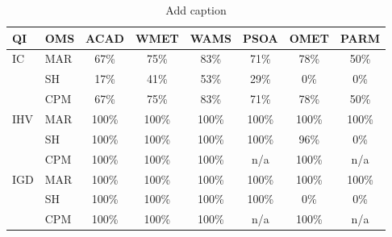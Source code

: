 \begin{table}[htbp]
  \centering
  \caption{Add caption}
    \begin{tabular}{llcccccc}
    \toprule
    \textbf{QI} & \textbf{OMS} & \textbf{ACAD} & \textbf{WMET} & \textbf{WAMS} & \textbf{PSOA} & \textbf{OMET} & \textbf{PARM} \\
    \midrule
    \multirow{3}[1]{*}{IC} & MAR   & 67\%  & 75\%  & 83\%  & 71\%  & 78\%  & 50\% \\
          & SH    & 17\%  & 41\%  & 53\%  & 29\%  & 0\%   & 0\% \\
          & CPM   & 67\%  & 75\%  & 83\%  & 71\%  & 78\%  & 50\% \\
    \multirow{3}[2]{*}{IHV} & MAR   & 100\% & 100\% & 100\% & 100\% & 100\% & 100\% \\
          & SH    & 100\% & 100\% & 100\% & 100\% & 96\%  & 0\% \\
          & CPM   & 100\% & 100\% & 100\% & n/a   & 100\% & n/a \\
    \multirow{3}[2]{*}{IGD} & MAR   & 100\% & 100\% & 100\% & 100\% & 100\% & 100\% \\
          & SH    & 100\% & 100\% & 100\% & 100\% & 0\%   & 0\% \\
          & CPM   & 100\% & 100\% & 100\% & n/a   & 100\% & n/a \\
    \bottomrule
    \end{tabular}%
  \label{tab:addlabel}%
\end{table}%

